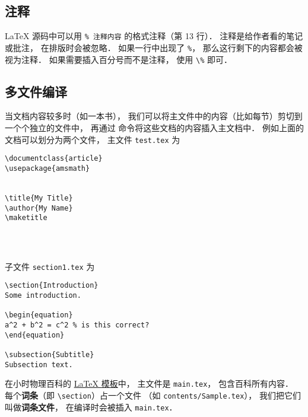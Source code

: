 \subsection{注释}
LaTeX 源码中可以用 \lstinline|% 注释内容| 的格式注释（第 13 行）． 注释是给作者看的笔记或批注， 在排版时会被忽略． 如果一行中出现了 \lstinline|%|， 那么这行剩下的内容都会被视为注释． 如果需要插入百分号而不是注释， 使用 \lstinline|\%| 即可．

\subsection{多文件编译}
当文档内容较多时（如一本书）， 我们可以将主文件中的内容（比如每节）剪切到一个个独立的文件中， 再通过 \lstinline|| 命令将这些文档的内容插入主文档中． 例如上面的文档可以划分为两个文件， 主文件 \lstinline|test.tex| 为
\begin{lstlisting}
\documentclass{article}
\usepackage{amsmath}


\title{My Title}
\author{My Name}
\maketitle




\end{lstlisting}

子文件 \lstinline|section1.tex| 为
\begin{lstlisting}
\section{Introduction}
Some introduction.

\begin{equation}
a^2 + b^2 = c^2 % is this correct?
\end{equation}

\subsection{Subtitle}
Subsection text.
\end{lstlisting}

在小时物理百科的 \href{https://github.com/MacroUniverse/PhysWiki}{LaTeX 模板}中， 主文件是 \lstinline|main.tex|， 包含百科所有内容． 每个\textbf{词条}（即 \lstinline|\section|）占一个文件 （如 \lstinline|contents/Sample.tex|）， 我们把它们叫做\textbf{词条文件}， 在编译时会被插入 \lstinline|main.tex|．

